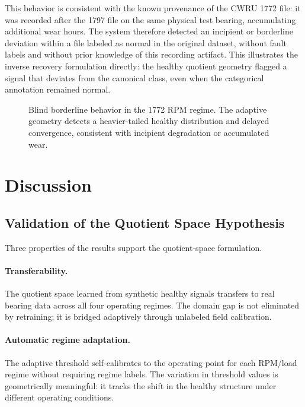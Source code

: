 \documentclass[11pt]{article}
\begin{document}
This behavior is consistent with the known provenance of the CWRU 1772 file: it was recorded after the 1797 file on the same physical test bearing, accumulating additional wear hours. The system therefore detected an incipient or borderline deviation within a file labeled as normal in the original dataset, without fault labels and without prior knowledge of this recording artifact. This illustrates the inverse recovery formulation directly: the healthy quotient geometry flagged a signal that deviates from the canonical class, even when the categorical annotation remained normal.

\begin{figure}[H]
    \centering
    \caption{Blind borderline behavior in the 1772 RPM regime. The adaptive geometry detects a heavier-tailed healthy distribution and delayed convergence, consistent with incipient degradation or accumulated wear.}
    \label{fig:blind_1772}
\end{figure}

\section{Discussion}

\subsection{Validation of the Quotient Space Hypothesis}

Three properties of the results support the quotient-space formulation.

\paragraph{Transferability.}
The quotient space learned from synthetic healthy signals transfers to real bearing data across all four operating regimes. The domain gap is not eliminated by retraining; it is bridged adaptively through unlabeled field calibration.

\paragraph{Automatic regime adaptation.}
The adaptive threshold self-calibrates to the operating point for each RPM/load regime without requiring regime labels. The variation in threshold values is geometrically meaningful: it tracks the shift in the healthy structure under different operating conditions.
\end{document}
